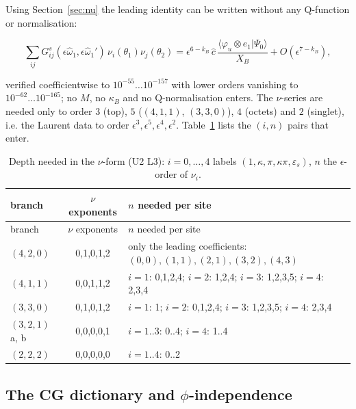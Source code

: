 \documentclass[11pt]{article}
\begin{document}
Using Section~\ref{sec:nu} the leading identity can be written without any Q-function or normalisation:

\begin{equation}
\sum_{ij}G^s_{ij}(\epsilon\hat\omega_1,\epsilon\hat\omega_1')\,\nu_i(\theta_1)\nu_j(\theta_2)=\epsilon^{6-k_B}\,\hat c\,\frac{\langle\varphi_u\otimes e_1|\Psi_0\rangle}{X_B}+O(\epsilon^{7-k_B}),\label{eq:limitnu}
\end{equation}

verified coefficientwise to $10^{-55}\ldots10^{-157}$ with lower orders vanishing to $10^{-62}\ldots10^{-165}$; no $M$, no $\kappa_B$ and no Q-normalisation enters.
The $\nu$-series are needed only to order $3$ (top), $5$ ($(4,1,1)$, $(3,3,0)$), $4$ (octets) and $2$ (singlet), i.e. the Laurent data to order $\epsilon^3,\epsilon^5,\epsilon^4,\epsilon^2$. Table~\ref{tab:nudepth} lists the $(i,n)$ pairs that enter.

{\small
\begin{longtable}{lcl}
\caption{Depth needed in the $\nu$-form (U2 L3): $i=0,\dots,4$ labels $(1,\kappa,\pi,\kappa\pi,\varepsilon_s)$, $n$ the $\epsilon$-order of $\nu_i$.}\label{tab:nudepth}\\
\toprule
branch & $\nu$ exponents & $n$ needed per site \\
\midrule
\endfirsthead
\toprule
branch & $\nu$ exponents & $n$ needed per site \\
\midrule
\endhead
\bottomrule
\endlastfoot
$(4,2,0)$ & 0,1,0,1,2 & only the leading coefficients: $(0,0),(1,1),(2,1),(3,2),(4,3)$ \\
$(4,1,1)$ & 0,0,1,1,2 & $i{=}1$: 0,1,2,4; $i{=}2$: 1,2,4; $i{=}3$: 1,2,3,5; $i{=}4$: 2,3,4 \\
$(3,3,0)$ & 0,1,0,1,2 & $i{=}1$: 1; $i{=}2$: 0,1,2,4; $i{=}3$: 1,2,3,5; $i{=}4$: 2,3,4 \\
$(3,2,1)$ a, b & 0,0,0,0,1 & $i{=}1..3$: 0..4; $i{=}4$: 1..4 \\
$(2,2,2)$ & 0,0,0,0,0 & $i{=}1..4$: 0..2 \\
\end{longtable}}


\subsection{The CG dictionary and \texorpdfstring{$\phi$}{}-independence}\label{sec:dictionary}
\end{document}

